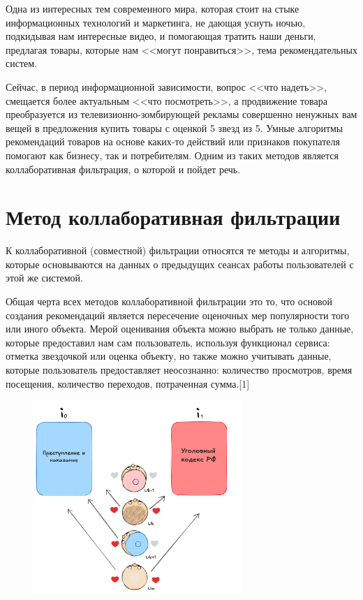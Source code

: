 \documentclass[bachelor, och, referat]{shiza}
\begin{document}
\tableofcontents

\intro

Одна из интересных тем современного мира, которая стоит на стыке информационных технологий и маркетинга,
не дающая уснуть ночью, подкидывая нам интересные видео, и помогающая тратить наши деньги, предлагая товары,
которые нам <<могут понравиться>>, тема рекомендательных систем. 

Сейчас, в период информационной зависимости, вопрос 
<<что надеть>>, смещается более актуальным <<что посмотреть>>, а продвижение товара преобразуется из 
телевизионно-зомбирующей рекламы совершенно ненужных вам вещей в предложения купить товары с оценкой 5 звезд 
из 5. Умные алгоритмы рекомендаций товаров на основе каких-то действий или признаков покупателя помогают как бизнесу, 
так и потребителям. Одним из таких методов является коллаборативная фильтрация, о которой и пойдет речь. 


\section{Метод коллаборативная фильтрации}
К коллаборативной (совместной) фильтрации относятся те методы и
алгоритмы, которые основываются на данных о предыдущих сеансах работы пользователей с этой же
системой. 

Общая черта всех методов коллаборативной фильтрации это то, что основой создания
рекомендаций является пересечение оценочных мер популярности того или иного объекта.
Мерой оценивания объекта можно выбрать не только данные, которые предоставил нам сам пользователь, используя функционал сервиса: отметка звездочкой или оценка объекту,
но также можно учитывать данные, которые пользователь предоставляет неосознанно: 
количество просмотров, время посещения, количество переходов, потраченная сумма.[1]

\begin{figure}[H]
  \centering
  \includegraphics[width=0.7\textwidth]{./2.png}
  \caption{}
\end{figure}
\end{document}
